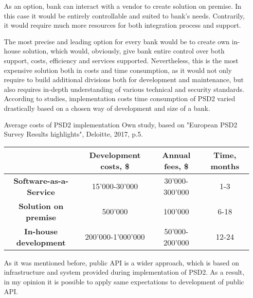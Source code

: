 As an option, bank can interact with a vendor to create solution on premise. 
In this case it would be entirely controllable and suited to bank's needs. 
Contrarily, it would require much more resources for both integration process and support.

The most precise and leading option for every bank would be to create own in-house solution, which would, obviously, give bank entire control over both support, costs, efficiency and services supported.
Nevertheless, this is the most expensive solution both in costs and time consumption, as it would not only require to build additional divisions both for development and maintenance, but also requires in-depth understanding of various technical and security standards.
According to studies, implementation costs time consumption of PSD2 varied drastically based on a chosen way of development and size of a bank. 
\cite{saltedge_open_banking_report}
\cite{deloitte_psd2_costs}

\mttable
{Average costs of PSD2 implementation}
{Own study, based on "European PSD2 Survey Results highlights", Deloitte, 2017, p.5.}
{
    \begin{tabular}{| c | c | c | c |}
        \hline
        &
        \textbf{Development costs, \$} & 
        \textbf{Annual fees, \$} &
        \textbf{Time, months} \\ \hline 
       
        \textbf{Software-as-a-Service} & 
            15'000-30'000 & 
            30'000-300'000 &
            1-3 \\ \hline 
       
        \textbf{Solution on premise} & 
            500'000 &
            100'000 &
            6-18 \\ \hline 

        \textbf{In-house development} &
            200'000-1'000'000 &
            50'000-200'000 &
            12-24 \\ \hline
    \end{tabular}
}

As it was mentioned before, public API is a wider approach, which is based on infrastructure and system provided during implementation of PSD2.
As a result, in my opinion it is possible to apply same expectations to development of public API.

